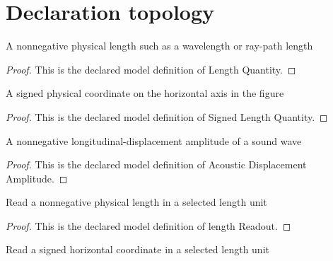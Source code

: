 \section{Declaration topology}
\begin{definition}
  \label{def:physics:phyx-mini-0313:phyxminiproblems-problemphyxmini0313-lengthquantity}
  A nonnegative physical length such as a wavelength or ray-path length
\end{definition}
\begin{proof}
  This is the declared model definition of Length Quantity.
\end{proof}
\begin{definition}
  \label{def:physics:phyx-mini-0313:phyxminiproblems-problemphyxmini0313-signedlengthquantity}
  A signed physical coordinate on the horizontal axis in the figure
\end{definition}
\begin{proof}
  This is the declared model definition of Signed Length Quantity.
\end{proof}
\begin{definition}
  \label{def:physics:phyx-mini-0313:phyxminiproblems-problemphyxmini0313-acousticdisplacementamplitude}
  A nonnegative longitudinal-displacement amplitude of a sound wave
\end{definition}
\begin{proof}
  This is the declared model definition of Acoustic Displacement Amplitude.
\end{proof}
\begin{definition}
  \label{def:physics:phyx-mini-0313:phyxminiproblems-problemphyxmini0313-lengthreadout}
  Read a nonnegative physical length in a selected length unit
\end{definition}
\begin{proof}
  This is the declared model definition of length Readout.
\end{proof}
\begin{definition}
  \label{def:physics:phyx-mini-0313:phyxminiproblems-problemphyxmini0313-signedlengthreadout}
  Read a signed horizontal coordinate in a selected length unit
\end{definition}
